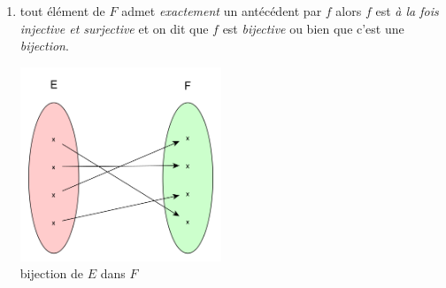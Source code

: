 \documentclass[a4paper,12pt,french]{book}
\begin{document}
\begin{definition}
\begin{enumerate}[--]
\begin{center}
		\end{center}
	\item tout élément de $F$ admet \textit{exactement} un antécédent par $f$ alors  $f$ est \textit{à la fois injective et surjective} et on dit que $f$ est \textit{bijective} ou bien que c'est une \textit{bijection}.
		\begin{center}
		\includegraphics[width=6cm]{img/ex_bij.png}\\ {\footnotesize bijection de $E$ dans $F$}
		\end{center}
\end{enumerate}
\end{definition}
\end{document}

